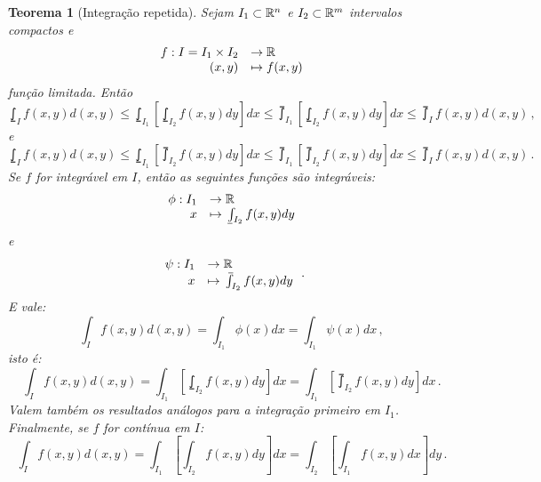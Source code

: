 \documentclass[a4paper,12pt]{extreport}
\newtheorem{myteo}[mydef]{Teorema}
\newif\ifspacesbetweentheos
\newcommand{\theonewpage}{
\ifspacesbetweentheos
  \newpage
\fi
}
\begin{document}
\begin{myteo}[Integração repetida]\label{teo:int_repetidas}
  Sejam $I_1 \subset \mathbb{R}^n$ e $I_2 \subset \mathbb{R}^m$ intervalos compactos
  e
  $$
  \begin{array}{rl}
    f:I = I_1 \times I_2 &\to \mathbb{R}\\
    (x,y) &\mapsto f(x,y)
  \end{array}
  $$
  função limitada.
  Então
  \begin{equation}
    \lowint_I f(x,y) d(x,y)
    \le \lowint_{I_1} \left[ \lowint_{I_2} f(x,y) dy \right] dx
    \le \upint_{I_1} \left[ \lowint_{I_2} f(x,y) dy \right] dx
    \le \upint_I f(x,y) d(x,y)\,,
  \end{equation}
  e
  \begin{equation}
    \lowint_I f(x,y) d(x,y)
    \le \lowint_{I_1} \left[ \upint_{I_2} f(x,y) dy \right] dx
    \le \upint_{I_1} \left[ \upint_{I_2} f(x,y) dy \right] dx
    \le \upint_I f(x,y) d(x,y)\,.
  \end{equation}
  Se $f$ for integrável em $I$,
  então as seguintes funções são integráveis:
  $$\deffunc{\phi}{I_1} {\realnumb}{x}{\lowint_{I_2} f(x,y) dy}$$
  e
  $$\deffunc{\psi}{I_1} {\realnumb}{x}{\upint_{I_2} f(x,y) dy}\,.$$
  E vale:
  \begin{equation}
    \int_I f(x,y) d(x,y)
    = \int_{I_1} \phi(x) dx
    = \int_{I_1} \psi(x) dx\,,
  \end{equation}
  isto é:
  \begin{equation}
    \int_I f(x,y) d(x,y)
    = \int_{I_1} \left[ \lowint_{I_2} f(x,y) dy \right] dx
    = \int_{I_1} \left[ \upint_{I_2} f(x,y) dy \right] dx\,.
  \end{equation}
  Valem também os resultados análogos para a integração primeiro
  em $I_1$. Finalmente, se $f$ for contínua em $I$:
  \begin{equation}
    \int_I f(x,y) d(x,y)
    = \int_{I_1} \left[ \int_{I_2} f(x,y) dy \right] dx
    = \int_{I_2} \left[ \int_{I_1} f(x,y) dx \right] dy\,.
  \end{equation}
\end{myteo}


\theonewpage
\end{document}

